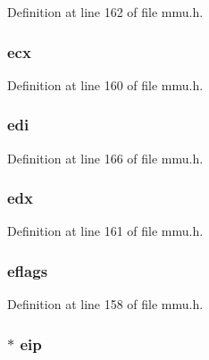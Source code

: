 Definition at line 162 of file mmu.\-h.

\hypertarget{structtaskstate_ab36b3e14ca8cf65ad02ef0b466bff207}{
\subsubsection[{ecx}]{ ecx}}\label{structtaskstate_ab36b3e14ca8cf65ad02ef0b466bff207}


Definition at line 160 of file mmu.\-h.

\hypertarget{structtaskstate_a5d017b35dd2b40671e27c7ae6c276b23}{
\subsubsection[{edi}]{ edi}}\label{structtaskstate_a5d017b35dd2b40671e27c7ae6c276b23}


Definition at line 166 of file mmu.\-h.

\hypertarget{structtaskstate_a897b994c12c5e0174809a975642fe7fb}{
\subsubsection[{edx}]{ edx}}\label{structtaskstate_a897b994c12c5e0174809a975642fe7fb}


Definition at line 161 of file mmu.\-h.

\hypertarget{structtaskstate_a96d2765012333ea2615dda6ac2521d61}{
\subsubsection[{eflags}]{ eflags}}\label{structtaskstate_a96d2765012333ea2615dda6ac2521d61}


Definition at line 158 of file mmu.\-h.

\hypertarget{structtaskstate_a20cd904809a7d6c9d5e573f1539e8436}{
\subsubsection[{eip}]{$\ast$ eip}}\label{structtaskstate_a20cd904809a7d6c9d5e573f1539e8436}


